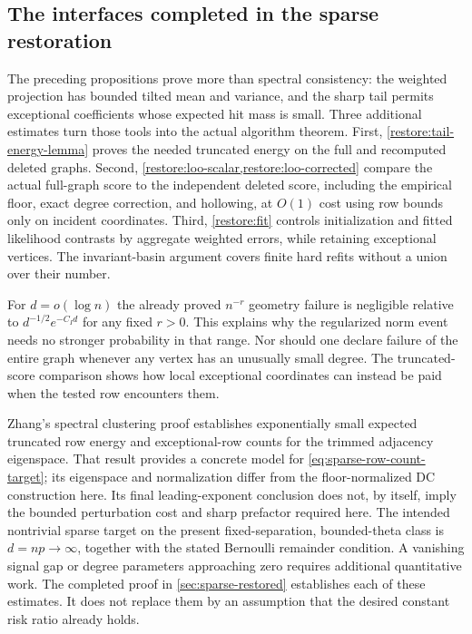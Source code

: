 \subsection{The interfaces completed in the sparse restoration}

The preceding propositions prove more than spectral consistency:
the weighted projection has bounded tilted mean and variance, and the
sharp tail permits exceptional coefficients whose expected hit mass is
small. Three additional estimates turn those tools into the actual
algorithm theorem. First, \cref{restore:tail-energy-lemma} proves the
needed truncated energy on the full and recomputed deleted graphs.
Second, \cref{restore:loo-scalar,restore:loo-corrected} compare the
actual full-graph score to the independent deleted score, including
the empirical floor, exact degree correction, and hollowing, at
$O(1)$ cost using row bounds only on incident coordinates.
Third, \cref{restore:fit} controls initialization and fitted likelihood
contrasts by aggregate weighted errors, while retaining exceptional
vertices. The invariant-basin argument covers finite hard refits
without a union over their number.

For $d=o(\log n)$ the already proved $n^{-r}$ geometry failure is
negligible relative to $d^{-1/2}e^{-C_Id}$ for any fixed $r>0$.
This explains why the regularized norm event needs no stronger
probability in that range. Nor should one declare failure of the entire
graph whenever any vertex has an unusually small degree. The
truncated-score comparison shows how local exceptional coordinates can
instead be paid when the tested row encounters them.

Zhang's spectral clustering proof
\cite[Theorem 3 and Corollary 1, p.~7326]{zhang} establishes exponentially
small expected truncated row energy and exceptional-row counts for
the trimmed adjacency eigenspace. That result provides a concrete
model for \eqref{eq:sparse-row-count-target}; its eigenspace and
normalization differ from the floor-normalized DC construction here.
Its final leading-exponent conclusion does not, by itself, imply
the bounded perturbation cost and sharp prefactor required here.
The intended nontrivial sparse target on the present fixed-separation,
bounded-theta class is $d=np\to\infty$, together with the stated
Bernoulli remainder condition. A vanishing signal gap or degree
parameters approaching zero requires additional quantitative work.
The completed proof in \cref{sec:sparse-restored} establishes each
of these estimates. It does not replace them by an assumption that
the desired constant risk ratio already holds.

